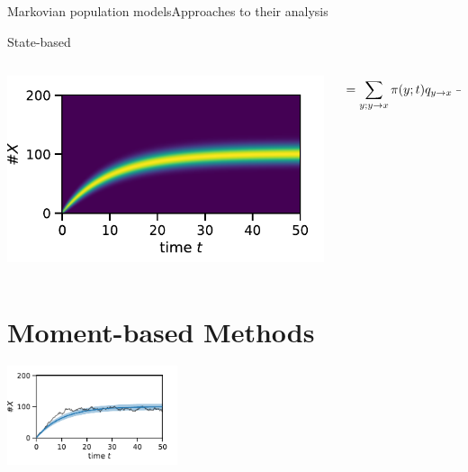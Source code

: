 \documentclass[9pt]{beamer}
\begin{document}
\begin{frame}{Markovian population models}{Approaches to their analysis}
\begin{block}{State-based}
\begin{columns}
                  \begin{column}{.4\textwidth}
                      \centering
    \includegraphics[width=\textwidth]{../gfx/bd_dist.pdf}
                  \end{column}
                  \begin{column}{.45\textwidth}
                      \vspace{-2em}
                      \[
                      \hspace{-4em}
                      \frac{d}{dt}\pi(x;t)= \sum_{y;y\to x}\pi(y;t)q_{y\to x} - \pi(x;t)q_{x\to y}
        \]
                  \end{column}
              \end{columns}
          \end{block}
\end{frame}

\section{Moment-based Methods}
\begin{frame}
  \vfill
  \centering
    \insertsectionhead\par%
    \vspace{1cm}
    \includegraphics[width=5cm]{../gfx/momsandsims.pdf}
  \vfill
\end{frame}
\end{document}
